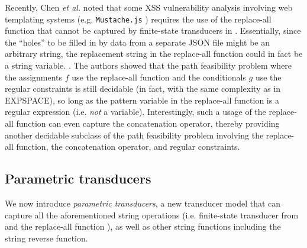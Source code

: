 Recently, Chen \emph{et al.} \cite{CCHLW18}  noted that some XSS vulnerability
analysis involving web templating systems (e.g. \texttt{Mustache.js}
\cite{Mustache}) requires the use of the replace-all 
function that cannot be
captured by finite-state transducers in \cite{LB16}. Essentially, since the ``holes'' to be 
filled in by data from a separate JSON file might be an arbitrary string, the
replacement string in the replace-all function could in fact be a string
variable. . The authors
showed that the path feasibility problem where the assignments $f$ use the
replace-all function and the conditionals $g$ use the regular constraints 
is still decidable (in fact, with the same complexity as in \cite{LB16} 
EXPSPACE), so long as the pattern variable in the replace-all function is a
regular expression (i.e. \emph{not} a variable). Interestingly, such a usage of
the replace-all function can even capture the concatenation operator, thereby
providing another decidable subclass of the path feasibility problem involving
the replace-all function, the concatenation operator, and regular constraints.

 



\subsection{Parametric transducers}

We now introduce \emph{parametric transducers}, a new transducer model that can 
capture all the
aforementioned string operations (i.e. finite-state transducer from
\cite{LB16} and the replace-all function \cite{CCHLW18}), as well as other 
string functions including the string reverse function.

